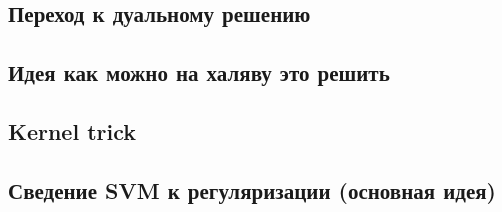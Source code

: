 \documentclass[14pt, fleqn, xcolor={dvipsnames, table}]{beamer}
\begin{document}
\subsection{Переход к дуальному решению}
\subsection{Идея как можно на халяву это решить}
\subsection{Kernel trick}
\subsection{Сведение SVM к регуляризации (основная идея)}
\end{document}
